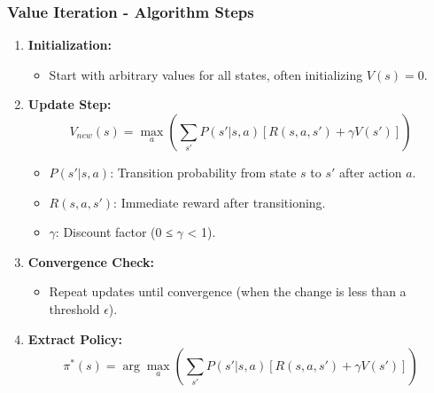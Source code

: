 \documentclass[aspectratio=169]{beamer}
\begin{document}
\begin{frame}[fragile]
    \frametitle{Value Iteration - Algorithm Steps}
    \begin{enumerate}
        \item \textbf{Initialization:}
            \begin{itemize}
                \item Start with arbitrary values for all states, often initializing \( V(s) = 0 \).
            \end{itemize}
        
        \item \textbf{Update Step:}
            \begin{equation}
                V_{new}(s) = \max_a \left( \sum_{s'} P(s' | s, a) [R(s, a, s') + \gamma V(s')] \right)
            \end{equation}
            \begin{itemize}
                \item \( P(s' | s, a) \): Transition probability from state \( s \) to \( s' \) after action \( a \).
                \item \( R(s, a, s') \): Immediate reward after transitioning.
                \item \( \gamma \): Discount factor (0 ≤ \( \gamma \) < 1).
            \end{itemize}

        \item \textbf{Convergence Check:}
            \begin{itemize}
                \item Repeat updates until convergence (when the change is less than a threshold \( \epsilon \)).
            \end{itemize}
        
        \item \textbf{Extract Policy:}
            \begin{equation}
                \pi^*(s) = \arg\max_a \left( \sum_{s'} P(s' | s, a) [R(s, a, s') + \gamma V(s')] \right)
            \end{equation}
    \end{enumerate}
\end{frame}
\end{document}
